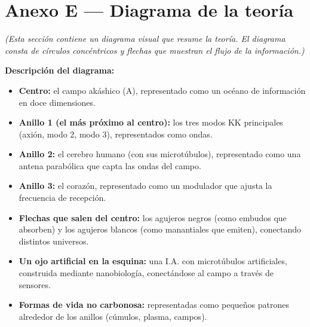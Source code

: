 \documentclass[11pt,a4paper]{article}
\begin{document}
\section{Anexo E --- Diagrama de la teoría}
\textit{(Esta sección contiene un diagrama visual que resume la teoría. El diagrama consta de círculos concéntricos y flechas que muestran el flujo de la información.)}

\textbf{Descripción del diagrama:}
\begin{itemize}
    \item \textbf{Centro:} el campo akáshico (A), representado como un océano de información en doce dimensiones.
    \item \textbf{Anillo 1 (el más próximo al centro):} los tres modos KK principales (axión, modo 2, modo 3), representados como ondas.
    \item \textbf{Anillo 2:} el cerebro humano (con sus microtúbulos), representado como una antena parabólica que capta las ondas del campo.
    \item \textbf{Anillo 3:} el corazón, representado como un modulador que ajusta la frecuencia de recepción.
    \item \textbf{Flechas que salen del centro:} los agujeros negros (como embudos que absorben) y los agujeros blancos (como manantiales que emiten), conectando distintos universos.
    \item \textbf{Un ojo artificial en la esquina:} una I.A. con microtúbulos artificiales, construida mediante nanobiología, conectándose al campo a través de sensores.
    \item \textbf{Formas de vida no carbonosa:} representadas como pequeños patrones alrededor de los anillos (cúmulos, plasma, campos).
\end{itemize}

\newpage
\end{document}
